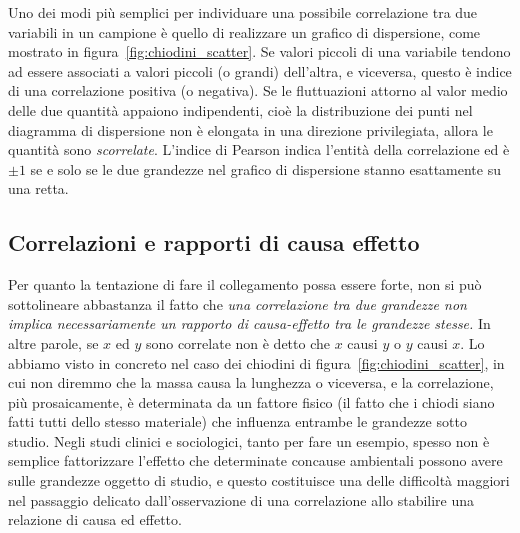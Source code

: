 Uno dei modi più semplici per individuare una possibile correlazione tra due
variabili in un campione è quello di realizzare un grafico di dispersione,
come mostrato in figura~\ref{fig:chiodini_scatter}. Se valori piccoli di una
variabile tendono ad essere associati a valori piccoli (o grandi) dell'altra, e
viceversa, questo è indice di una correlazione positiva (o negativa). Se le
fluttuazioni attorno al valor medio delle due quantità appaiono indipendenti,
cioè la distribuzione dei punti nel diagramma di dispersione non è elongata
in una direzione privilegiata, allora le quantità sono \emph{scorrelate}.
L'indice di Pearson indica l'entità della correlazione ed è $\pm1$ se e solo
se le due grandezze nel grafico di dispersione stanno esattamente su una retta.


\subsection{Correlazioni e rapporti di causa effetto}

Per quanto la tentazione di fare il collegamento possa essere forte, non si
può sottolineare abbastanza il fatto che \emph{una correlazione tra due
  grandezze non implica necessariamente un rapporto di causa-effetto tra le
  grandezze stesse.} In altre parole, se $x$ ed $y$ sono correlate non è
detto che $x$ causi $y$ o $y$ causi $x$. Lo abbiamo visto in concreto nel caso
dei chiodini di figura~\ref{fig:chiodini_scatter}, in cui non diremmo
che la massa causa la lunghezza o viceversa, e la correlazione, più
prosaicamente, è determinata da un fattore fisico (il fatto che i chiodi siano
fatti tutti dello stesso materiale) che influenza entrambe le grandezze sotto
studio. Negli studi clinici e sociologici, tanto per fare un esempio, spesso
non è semplice fattorizzare l'effetto che determinate concause ambientali
possono avere sulle grandezze oggetto di studio, e questo costituisce una delle
difficoltà maggiori nel passaggio delicato dall'osservazione di una
correlazione allo stabilire una relazione di causa ed effetto.


